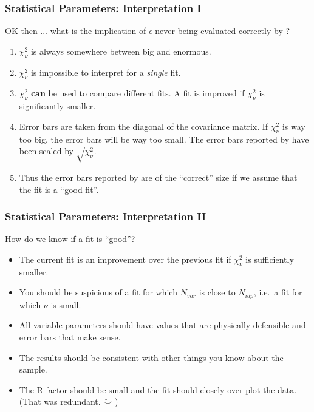\documentclass[10pt, xcolor=x11names, compress]{beamer}
\begin{document}
\begin{frame}
  \frametitle{Statistical Parameters: Interpretation I}

  \begin{exampleblock}{}
    OK then ... what is the implication of $\epsilon$ never being
    evaluated correctly by {\artemis}?
  \end{exampleblock}

  \begin{enumerate}[<+->]
  \item $\chi^2_\nu$ is always somewhere between big and enormous.
  \item $\chi^2_\nu$ is impossible to interpret for a \textit{single} fit.
  \item $\chi^2_\nu$ {\color{Green4}\textbf{can}} be used to compare
    different fits.  A fit is improved if $\chi^2_\nu$ is
    significantly smaller.
  \item Error bars are taken from the diagonal of the covariance
    matrix.  If $\chi^2_\nu$ is way too big, the error bars will be way
    too small.  The error bars reported by {\artemis} have been scaled
    by $\sqrt{\chi^2_\nu}$.
  \item Thus the error bars reported by {\artemis} are of the
    {\color{Green4}``correct''} size if we assume that the fit
    is a {\color{Green4}``good fit''}.
  \end{enumerate}
\end{frame}

\begin{frame}
  \frametitle{Statistical Parameters: Interpretation II}

  \begin{exampleblock}{}
    \begin{center}
      How do we know if a fit is ``good''?
    \end{center}
  \end{exampleblock}
  \begin{itemize}[<+->]
  \item The current fit is an improvement over the previous fit if
    $\chi^2_\nu$ is sufficiently smaller.
  \item You should be suspicious of a fit for which $N_{var}$ is close
    to $N_{idp}$, i.e.\ a fit for which $\nu$ is small.
  \item All variable parameters should have values that are physically
    defensible and error bars that make sense.
  \item The results should be consistent with other things you know
    about the sample.
  \item The R-factor should be small and the fit should closely
    over-plot the data.  (That was redundant. $\ddot\smile$ )
  \end{itemize}
\end{frame}
\end{document}

